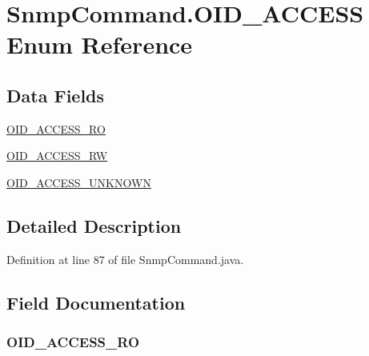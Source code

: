 \hypertarget{enummib2bib_1_1_snmp_command_1_1_o_i_d___a_c_c_e_s_s}{}\section{Snmp\+Command.\+O\+I\+D\+\_\+\+A\+C\+C\+E\+S\+S Enum Reference}
\label{enummib2bib_1_1_snmp_command_1_1_o_i_d___a_c_c_e_s_s}
\subsection*{Data Fields}
\begin{DoxyCompactItemize}
\item 
\hyperlink{enummib2bib_1_1_snmp_command_1_1_o_i_d___a_c_c_e_s_s_a498221ddbd6dedea13557d794bb090f5}{O\+I\+D\+\_\+\+A\+C\+C\+E\+S\+S\+\_\+\+R\+O}
\item 
\hyperlink{enummib2bib_1_1_snmp_command_1_1_o_i_d___a_c_c_e_s_s_a05dfc94220fa1fbd32b5fe1d0bdefa2b}{O\+I\+D\+\_\+\+A\+C\+C\+E\+S\+S\+\_\+\+R\+W}
\item 
\hyperlink{enummib2bib_1_1_snmp_command_1_1_o_i_d___a_c_c_e_s_s_aee9678b6556f58c7a98d0a343b1e93e7}{O\+I\+D\+\_\+\+A\+C\+C\+E\+S\+S\+\_\+\+U\+N\+K\+N\+O\+W\+N}
\end{DoxyCompactItemize}


\subsection{Detailed Description}


Definition at line 87 of file Snmp\+Command.\+java.



\subsection{Field Documentation}
\hypertarget{enummib2bib_1_1_snmp_command_1_1_o_i_d___a_c_c_e_s_s_a498221ddbd6dedea13557d794bb090f5}{}
\subsubsection[{O\+I\+D\+\_\+\+A\+C\+C\+E\+S\+S\+\_\+\+R\+O}]{\setlength{\rightskip}{0pt plus 5cm}O\+I\+D\+\_\+\+A\+C\+C\+E\+S\+S\+\_\+\+R\+O}\label{enummib2bib_1_1_snmp_command_1_1_o_i_d___a_c_c_e_s_s_a498221ddbd6dedea13557d794bb090f5}



